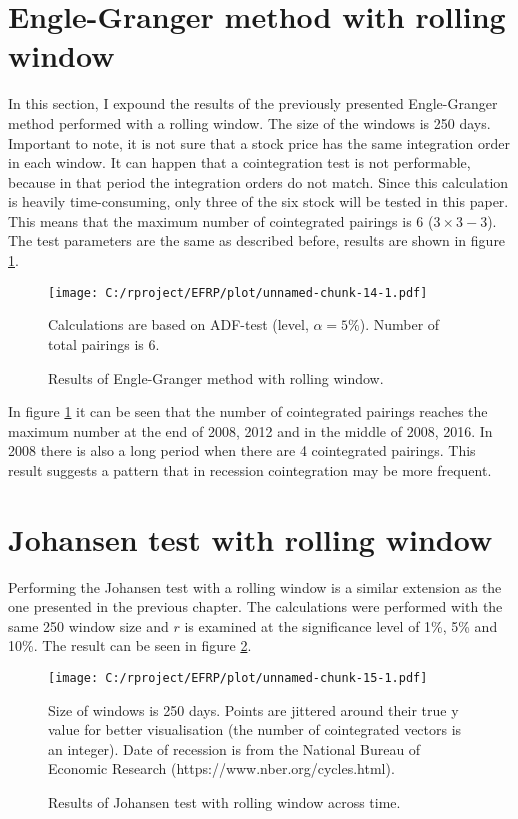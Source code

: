 \documentclass[12pt, a4paper, twoside, titlepage]{article}
\begin{document}
\section{Engle-Granger method with rolling window}
\fancyhead[LE,RO]{}

In this section, I expound the results of the previously presented Engle-Granger method performed with a rolling window. The size of the windows is 250 days. Important to note, it is not sure that a stock price has the same integration order in each window. It can happen that a cointegration test is not performable, because in that period the integration orders do not match. Since this calculation is heavily time-consuming, only three of the six stock will be tested in this paper. This means that the maximum number of cointegrated pairings is 6 ($3 \times 3 - 3$). The test parameters are the same as described before, results are shown in figure \ref{fig6}.

\begin{figure}[ht]
  \centering
  \texttt{[image: C:/rproject/EFRP/plot/unnamed-chunk-14-1.pdf]}
  \caption{Results of Engle-Granger method with rolling window.}
  \label{fig6}
  Calculations are based on ADF-test (level, $\alpha = 5\%$). Number of total pairings is 6.
\end{figure}

In figure \ref{fig6} it can be seen that the number of cointegrated pairings reaches the maximum number at the end of 2008, 2012 and in the middle of 2008, 2016. In 2008 there is also a long period when there are 4 cointegrated pairings. This result suggests a pattern that in recession cointegration may be more frequent.

\section{Johansen test with rolling window}


Performing the Johansen test with a rolling window is a similar extension as the one presented in the previous chapter. The calculations were performed with the same 250 window size and $r$ is examined at the significance level of 1\%, 5\% and 10\%. The result can be seen in figure \ref{fig7}.

\begin{figure}[ht]
  \centering
  \texttt{[image: C:/rproject/EFRP/plot/unnamed-chunk-15-1.pdf]}
  \caption{Results of Johansen test with rolling window across time.}
  \label{fig7}
  
  Size of windows is 250 days. Points are jittered around their true y value for better visualisation (the number of cointegrated vectors is an integer). Date of recession is from the National Bureau of Economic Research (https://www.nber.org/cycles.html).
\end{figure}
\end{document}
